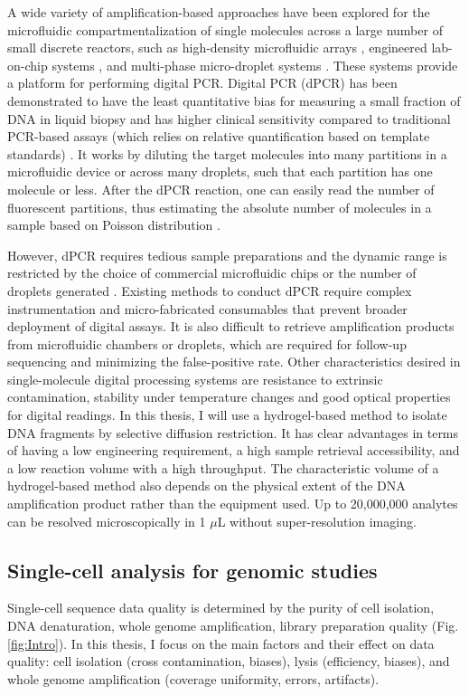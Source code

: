 A wide variety of amplification-based approaches have been explored for the microfluidic compartmentalization of single molecules across a large number of small discrete reactors, such as high-density microfluidic arrays \cite{Love:2013hf}, engineered lab-on-chip systems \cite{Thorsen:2002dn,Landry:2013dh,deBourcy:2014ji,Marcy:2007ip}, and multi-phase micro-droplet systems \cite{Fu:2015gl,Thorsen:2001td,Hindson:2011fg,Morinishi:2015jx}. These systems provide a platform for performing digital PCR. Digital PCR (dPCR) has been demonstrated to have the least quantitative bias for measuring a small fraction of DNA in liquid biopsy and has higher clinical sensitivity compared to traditional PCR-based assays (which relies on relative quantification based on template standards) \cite{Lun:2008cp,Bengtsson:2005ep,Wills:2013ht}. It works by diluting the target molecules into many partitions in a microfluidic device or across many droplets, such that each partition has one molecule or less. After the dPCR reaction, one can easily read the number of fluorescent partitions, thus estimating the absolute number of molecules in a sample based on Poisson distribution \cite{Vogelstain:1999ve}. 

However, dPCR requires tedious sample preparations and the dynamic range is restricted by the choice of commercial microfluidic chips or the number of droplets generated \cite{Hindson:2011fg}. Existing methods to conduct dPCR require complex instrumentation and micro-fabricated consumables that prevent broader deployment of digital assays. It is also difficult to retrieve amplification products from microfluidic chambers or droplets, which are required for follow-up sequencing and minimizing the false-positive rate. Other characteristics desired in single-molecule digital processing systems are resistance to extrinsic contamination, stability under temperature changes and good optical properties for digital readings. In this thesis, I will use a hydrogel-based method to isolate DNA fragments by selective diffusion restriction. It has clear advantages in terms of having a low engineering requirement, a high sample retrieval accessibility, and a low reaction volume with a high throughput. The characteristic volume of a hydrogel-based method also depends on the physical extent of the DNA amplification product rather than the equipment used. Up to 20,000,000 analytes can be resolved microscopically in 1 $\mu$L without super-resolution imaging. 

\subsection{Single-cell analysis for genomic studies}
Single-cell sequence data quality is determined by the purity of cell isolation, DNA denaturation, whole genome amplification, library preparation quality (Fig. \ref{fig:Intro}). In this thesis, I focus on the main factors and their effect on data quality: cell isolation (cross contamination, biases), lysis (efficiency, biases), and whole genome amplification (coverage uniformity, errors, artifacts).

